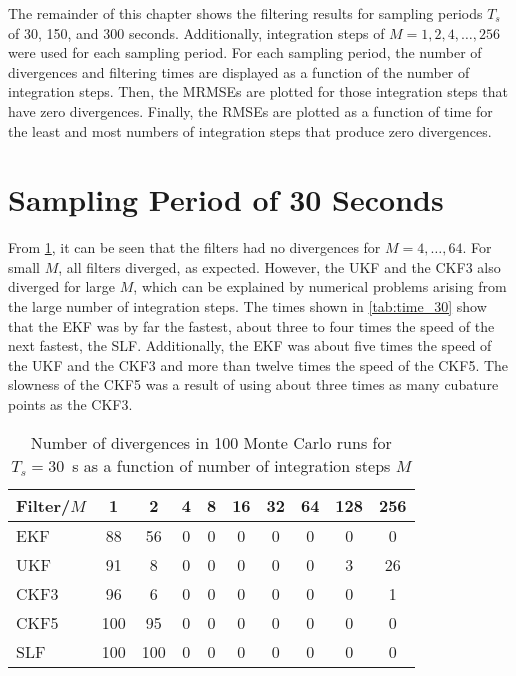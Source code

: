 \documentclass[../zhang_thesis.tex]{subfiles}
\begin{document}
The remainder of this chapter shows the filtering results for sampling periods $T_s$ of 30, 150, and 300 seconds. Additionally, integration steps of $M=1,2,4,\dots,256$ were used for each sampling period. For each sampling period, the number of divergences and filtering times are displayed as a function of the number of integration steps. Then, the MRMSEs are plotted for those integration steps that have zero divergences. Finally, the RMSEs are plotted as a function of time for the
least and most numbers of integration steps that produce zero divergences.

\section{Sampling Period of 30 Seconds}

From \cref{tab:div_30}, it can be seen that the filters had no divergences for $M=4,\dots,64$. For small $M$, all filters diverged, as expected. However, the UKF and the CKF3 also diverged for large $M$, which can be explained by numerical problems arising from the large number of integration steps. The times shown in \cref{tab:time_30} show that the EKF was by far the fastest, about three to four times the speed of the next fastest, the SLF. Additionally, the EKF was about five times the
speed of the UKF and the CKF3 and more than twelve times the speed of the CKF5. The slowness of the CKF5 was a result of using about three times as many cubature points as the CKF3.

\begin{table}[h]
\centering
\caption{Number of divergences in 100 Monte Carlo runs for $T_s=30$~s as a function of number of integration steps $M$}
\begin{tabular}{@{}l*{9}{c}@{}}
\toprule
Filter/$M$ & 1   & 2   & 4 & 8 & 16 & 32 & 64 & 128 & 256 \\
\midrule
EKF        & 88  & 56  & 0 & 0 & 0  & 0 & 0 & 0 & 0   \\
UKF        & 91  & 8   & 0 & 0 & 0  & 0 & 0 & 3 & 26  \\
CKF3       & 96  & 6   & 0 & 0 & 0  & 0 & 0 & 0 & 1   \\
CKF5       & 100 & 95  & 0 & 0 & 0  & 0 & 0 & 0 & 0   \\
SLF        & 100 & 100 & 0 & 0 & 0  & 0 & 0 & 0 & 0   \\
\bottomrule
\end{tabular}
\label{tab:div_30}
\end{table}
\end{document}
